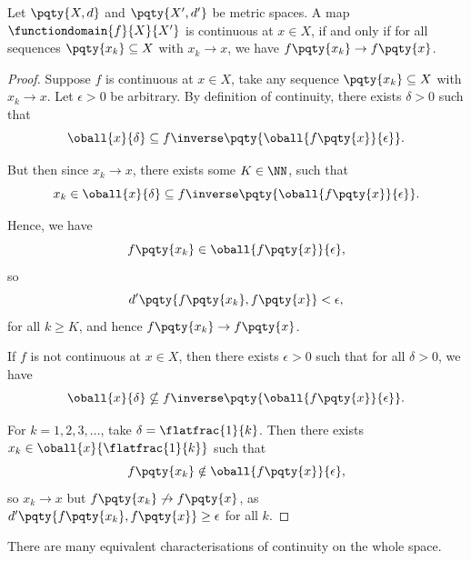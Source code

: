\begin{theorem}
    \label{thm:sequential-characterisation-of-continuity}%
    Let \(\pqty{X, d}\) and \(\pqty{X', d'}\) be metric spaces. A map \(\functiondomain{f}{X}{X'}\) is continuous at \(x \in X\), if and only if for all sequences \(\pqty{x_k} \subseteq X\) with \(x_k \to x\), we have \(f\pqty{x_k} \to f\pqty{x}\).
\end{theorem}

\begin{proof}
    Suppose \(f\) is continuous at \(x \in X\), take any sequence \(\pqty{x_k} \subseteq X\) with \(x_k \to x\). Let \(\epsilon > 0\) be arbitrary. By definition of continuity, there exists \(\delta > 0\) such that
    \[
        \oball{x}{\delta} \subseteq f\inverse\pqty{\oball{f\pqty{x}}{\epsilon}}.
    \]

    But then since \(x_k \to x\), there exists some \(K \in \NN\), such that
    \[
        x_k \in \oball{x}{\delta} \subseteq f\inverse\pqty{\oball{f\pqty{x}}{\epsilon}}.
    \]

    Hence, we have
    \[
        f\pqty{x_k} \in \oball{f\pqty{x}}{\epsilon},
    \]
    so
    \[
        d'\pqty{f\pqty{x_k}, f\pqty{x}} < \epsilon,
    \]
    for all \(k \geq K\), and hence \(f\pqty{x_k} \to f\pqty{x}\).

    If \(f\) is not continuous at \(x \in X\), then there exists \(\epsilon > 0\) such that for all \(\delta > 0\), we have
    \[
        \oball{x}{\delta} \nsubseteq f\inverse\pqty{\oball{f\pqty{x}}{\epsilon}}.
    \]

    For \(k = 1, 2, 3, \ldots\), take \(\delta = \flatfrac{1}{k}\). Then there exists \(x_k \in \oball{x}{\flatfrac{1}{k}}\) such that
    \[
        f\pqty{x_k} \notin \oball{f\pqty{x}}{\epsilon},
    \]
    so \(x_k \to x\) but \(f\pqty{x_k} \not\to f\pqty{x}\), as \(d'\pqty{f\pqty{x_k}, f\pqty{x}} \geq \epsilon\) for all \(k\).
\end{proof}

There are many equivalent characterisations of continuity on the whole space.


